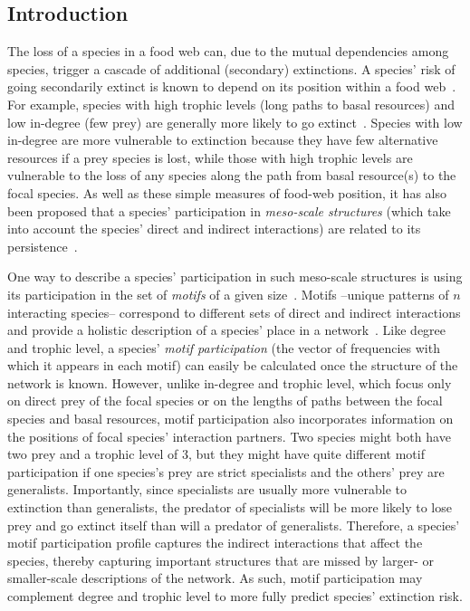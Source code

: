 \documentclass[12pt]{article}
\begin{document}
\clearpage
\begin{spacing}{2.0}

\section*{Introduction} %

    The loss of a species in a food web can, due to the mutual dependencies among species,  trigger a cascade of additional (secondary) extinctions. 
    A species' risk of going secondarily extinct is known to depend on its position within a food web~\citep{Santos2021,curtsdotter2011robustness, dunne2009cascading, Eklof2006}.
    For example, species with high trophic levels (long paths to basal resources) and low in-degree (few prey) are generally more likely to go extinct~\citep{Allesina2012,binzer2011susceptibility, Eklof2006}.
    Species with low in-degree are more vulnerable to extinction because they have few alternative resources if a prey species is lost, while those with high trophic levels are vulnerable to the loss of any species along the path from basal resource(s) to the focal species.
    As well as these simple measures of food-web position, it has also been proposed that a species' participation in \emph{meso-scale structures} (which take into account the species' direct and indirect interactions) are related to its persistence~\citep{Cirtwill2022Oikos}.
    
    
    One way to describe a species' participation in such meso-scale structures is using its participation in the set of \emph{motifs} of a given size~\citep{Cirtwill2015a,Cirtwill2018FoodWebs}.
    Motifs --unique patterns of $n$ interacting species-- correspond to different sets of direct and indirect interactions and provide a holistic description of a species' place in a network~\citep{Stouffer2007,Stouffer2012}.
    Like degree and trophic level, a species' \emph{motif participation} (the vector of frequencies with which it appears in each motif) can easily be calculated once the structure of the network is known.
    However, unlike in-degree and trophic level, which focus only on direct prey of the focal species or on the lengths of paths between the focal species and basal resources, motif participation also incorporates information on the positions of focal species' interaction partners.
    Two species might both have two prey and a trophic level of 3, but they might have quite different motif participation if one species's prey are strict specialists and the others' prey are generalists.
    Importantly, since specialists are usually more vulnerable to extinction than generalists, the predator of specialists will be more likely to lose prey and go extinct itself than will a predator of generalists.
    Therefore, a species' motif participation profile captures the indirect interactions that affect the species, thereby capturing important structures that are missed by larger- or smaller-scale descriptions of the network.
    As such, motif participation may complement degree and trophic level to more fully predict species' extinction risk.
    

\end{spacing}
\end{document}
